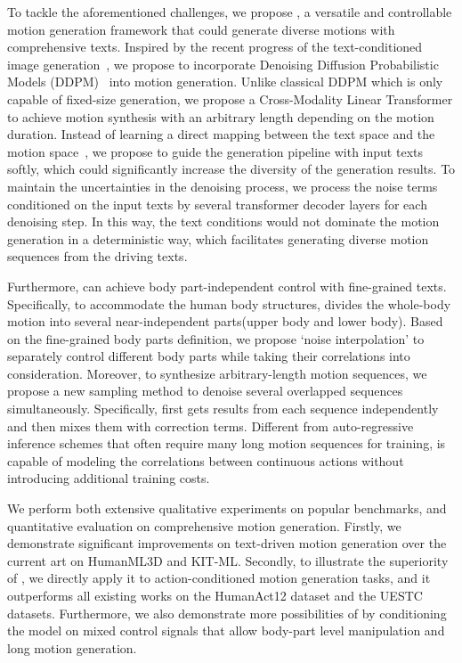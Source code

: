 To tackle the aforementioned challenges, we propose \textbf{\name}, a versatile and controllable motion generation framework that could generate diverse motions with comprehensive texts.
Inspired by the recent progress of the text-conditioned image generation~\citep{dhariwal2021diffusion,nichol2021improved,nichol2021glide,ramesh2022hierarchical}, we propose to incorporate Denoising Diffusion Probabilistic Models (DDPM)~\citep{ho2020denoising} into motion generation.
Unlike classical DDPM which is only capable of fixed-size generation, we propose a Cross-Modality Linear Transformer to achieve motion synthesis with an arbitrary length depending on the motion duration. 
Instead of learning a direct mapping between the text space and the motion space~\citep{tevet2022motionclip}, we propose to guide the generation pipeline with input texts softly, which could significantly increase the diversity of the generation results.
To maintain the uncertainties in the denoising process, we process the noise terms conditioned on the input texts by several transformer decoder layers for each denoising step.
In this way, the text conditions would not dominate the motion generation in a deterministic way, which facilitates generating diverse motion sequences from the driving texts.





Furthermore, \name can achieve body part-independent control with fine-grained texts.
Specifically, to accommodate the human body structures, \name divides the whole-body motion into several near-independent parts(\eg upper body and lower body).
Based on the fine-grained body parts definition, we propose `noise interpolation' to separately control different body parts while taking their correlations into consideration.
Moreover, to synthesize arbitrary-length motion sequences, we propose a new sampling method to denoise several overlapped sequences simultaneously.
Specifically, \name first gets results from each sequence independently and then mixes them with correction terms.
Different from auto-regressive inference schemes that often require many long motion sequences for training, \name is capable of modeling the correlations between continuous actions without introducing additional training costs.




We perform both extensive qualitative experiments on popular benchmarks, and quantitative evaluation on comprehensive motion generation. Firstly, we demonstrate significant improvements on text-driven motion generation over the current art on HumanML3D and KIT-ML. Secondly, to illustrate the superiority of \name, we directly apply it to action-conditioned motion generation tasks, and it outperforms all existing works on the HumanAct12 dataset and the UESTC datasets. Furthermore, we also demonstrate more possibilities of \name by conditioning the model on mixed control signals that allow body-part level manipulation and long motion generation.

